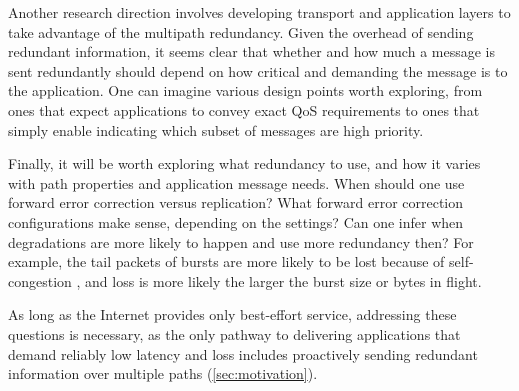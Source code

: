 \documentclass[sigconf,nonacm,screen,letterpaper,10pt]{acmart}
\begin{document}
Another research direction involves developing transport and application
layers to take advantage of the multipath redundancy. Given the overhead
of sending redundant information, it seems clear that whether and how
much a message is sent redundantly should depend on how critical and
demanding the message is to the application. One can imagine various
design points worth exploring, from ones that expect applications to
convey exact QoS requirements to ones that simply enable indicating
which subset of messages are high priority.

Finally, it will be worth exploring what redundancy to use, and how it
varies with path properties and application message needs. When should
one use forward error correction versus replication? What forward error
correction configurations make sense, depending on the settings? Can one
infer when degradations are more likely to happen and use more
redundancy then? For example, the tail packets of bursts are more likely
to be lost because of self-congestion \cite{virtue-gentle-aggression},
and loss is more likely the larger the burst size or bytes in flight.

As long as the Internet provides only best-effort service, addressing
these questions is necessary, as the only pathway to delivering
applications that demand reliably low latency and loss includes
proactively sending redundant information over multiple paths
(\cref{sec:motivation}).



\end{document}
